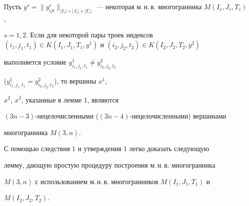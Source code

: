 \begin{cor}


Пусть $y^s=\|y_{ijt}^s\|_{|I_s|\times |J_s|\times


|T_s|}$ --- некоторая м.\,н.\,в. многогранника $M(I_s,J_s,T_s)$,


$s=1,2$. Если для некоторой пары троек индексов $(i_1,j_1,t_1)\in


K(I_1,J_1,T_1,y^1)$ и $(i_2,j_2,t_2)\in K(I_2,J_2,T_2,y^2)$


выполняется условие $y_{i_1,j_1,t_1}^1 \neq y_{i_2,j_2,t_2}^2$


($y_{i_1,j_1,t_1}^1 = y_{i_2,j_2,t_2}^2$), то вершины $x^1$,


$x^2$, $x^3$, указанные в лемме 1, являются


$(3n-3)$-нецелочисленными ($(3n-4)$-нецелочисленными) вершинами


многогранника $M(3,n)$.


\end{cor}





С помощью следствия 1 и утверждения 1 легко доказать следующую


лемму, дающую простую процедуру построения м.\,н.\,в. многогранника


$M(3,n)$ с использованием м.\,н.\,в. многогранников $M(I_1,J_1,T_1)$ и


$M(I_2,J_2,T_2)$.





